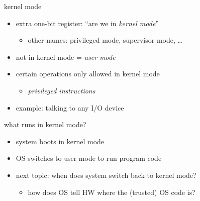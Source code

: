\begin{frame}{kernel mode}
\begin{itemize}
\item extra one-bit register: ``are we in \textit{kernel mode}''
    \begin{itemize}
    \item other names: privileged mode, supervisor mode, \ldots
    \end{itemize}
\item not in kernel mode = \textit{user mode}
\vspace{.5cm}
\item certain operations only allowed in kernel mode
    \begin{itemize}
    \item \textit{privileged instructions}
    \end{itemize}
\item example: talking to any I/O device
\end{itemize}
\end{frame}

\begin{frame}{what runs in kernel mode?}
\begin{itemize}
\item system boots in kernel mode
\item OS switches to user mode to run program code
\vspace{.5cm}
\item next topic: when does system switch back to kernel mode?
    \begin{itemize}
    \item how does OS tell HW where the (trusted) OS code is?
    \end{itemize}
\end{itemize}
\end{frame}
